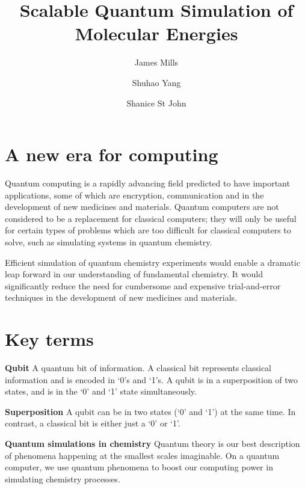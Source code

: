 \documentclass[14pt,landscape,color=UCLdarkred,margin=3cm]{uclposter}
\title{Scalable Quantum Simulation of Molecular Energies}
\author{James Mills}
\author{Shuhao Yang}
\author{Shanice St John}
\affil[1]{MSc Quantum Technologies, UCL}
\begin{document}

\maketitle

\begin{multicols}{3}

\section*{A new era for computing}


Quantum computing is a rapidly advancing field predicted to have important applications, some of which are encryption, communication and in the development of new medicines and materials. Quantum computers are not considered to be a replacement for classical computers; they will only be useful for certain types of problems which are too difficult for classical computers to solve, such as simulating systems in quantum chemistry.

Efficient simulation of quantum chemistry experiments would enable a dramatic leap forward in our understanding of fundamental chemistry. It would significantly reduce the need for cumbersome and expensive trial-and-error techniques in the development of new medicines and materials.

\section*{Key terms}


\begin{highlightbox}
	\textbf{Qubit} A quantum bit of information. A classical bit represents classical information and is encoded in `0's and `1's. A qubit is in a superposition of two states, and is in the `0' and `1' state simultaneously.
\end{highlightbox}

\begin{highlightbox}
  \textbf{Superposition} A qubit can be in two states (`0' and `1') at the same time. In contrast, a classical bit is either just a `0' or `1'.
\end{highlightbox}



\begin{highlightbox}
\textbf{Quantum simulations in chemistry} Quantum theory is our best description of phenomena happening at the smallest scales imaginable. On a quantum computer, we use quantum phenomena to boost our computing power in simulating chemistry processes.


\end{highlightbox}
\end{multicols}
\end{document}
